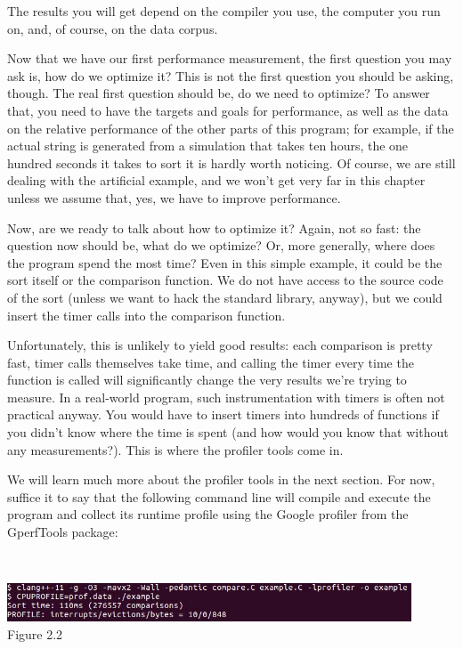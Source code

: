 The results you will get depend on the compiler you use, the computer you run on, and, of course, on the data corpus.

Now that we have our first performance measurement, the first question you may ask is, how do we optimize it? This is not the first question you should be asking, though. The real first question should be, do we need to optimize? To answer that, you need to have the targets and goals for performance, as well as the data on the relative performance of the other parts of this program; for example, if the actual string is generated from a simulation that takes ten hours, the one hundred seconds it takes to sort it is hardly worth noticing. Of course, we are still dealing with the artificial example, and we won't get very far in this chapter unless we assume that, yes, we have to improve performance.

Now, are we ready to talk about how to optimize it? Again, not so fast: the question now should be, what do we optimize? Or, more generally, where does the program spend the most time? Even in this simple example, it could be the sort itself or the comparison function. We do not have access to the source code of the sort (unless we want to hack the standard library, anyway), but we could insert the timer calls into the comparison function.

Unfortunately, this is unlikely to yield good results: each comparison is pretty fast, timer calls themselves take time, and calling the timer every time the function is called will significantly change the very results we're trying to measure. In a real-world program, such instrumentation with timers is often not practical anyway. You would have to insert timers into hundreds of functions if you didn't know where the time is spent (and how would you know that without any measurements?). This is where the profiler tools come in.

We will learn much more about the profiler tools in the next section. For now, suffice it to say that the following command line will compile and execute the program and collect its runtime profile using the Google profiler from the GperfTools package:

\hspace*{\fill} \\ %
\begin{center}
\includegraphics[width=0.9\textwidth]{content/1/chapter2/images/2.jpg}\\
Figure 2.2
\end{center}

